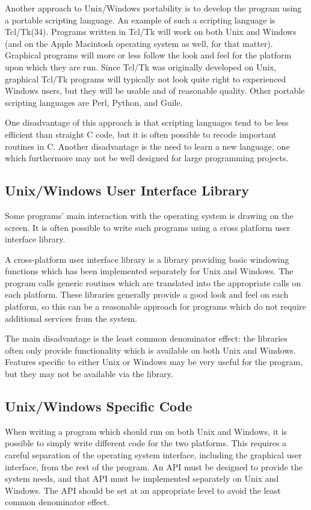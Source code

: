 Another approach to Unix/Windows portability is to develop the program using a portable scripting language. An example of such a scripting language is Tcl/Tk(34). Programs written in Tcl/Tk will work on both Unix and Windows (and on the Apple Macintosh operating system as well, for that matter). Graphical programs will more or less follow the look and feel for the platform upon which they are run. Since Tcl/Tk was originally developed on Unix, graphical Tcl/Tk programs will typically not look quite right to experienced Windows users, but they will be usable and of reasonable quality. Other portable scripting languages are Perl, Python, and Guile.

One disadvantage of this approach is that scripting languages tend to be less efficient than straight C code, but it is often possible to recode important routines in C. Another disadvantage is the need to learn a new language, one which furthermore may not be well designed for large programming projects. 

\subsection{Unix/Windows User Interface Library}

Some programs' main interaction with the operating system is drawing on the screen. It is often possible to write such programs using a cross platform user interface library.

A cross-platform user interface library is a library providing basic windowing functions which has been implemented separately for Unix and Windows. The program calls generic routines which are translated into the appropriate calls on each platform. These libraries generally provide a good look and feel on each platform, so this can be a reasonable approach for programs which do not require additional services from the system.

The main disadvantage is the least common denominator effect: the libraries often only provide functionality which is available on both Unix and Windows. Features specific to either Unix or Windows may be very useful for the program, but they may not be available via the library. 

\subsection{Unix/Windows Specific Code}

When writing a program which should run on both Unix and Windows, it is possible to simply write different code for the two platforms. This requires a careful separation of the operating system interface, including the graphical user interface, from the rest of the program. An API must be designed to provide the system needs, and that API must be implemented separately on Unix and Windows. The API should be set at an appropriate level to avoid the least common denominator effect.

